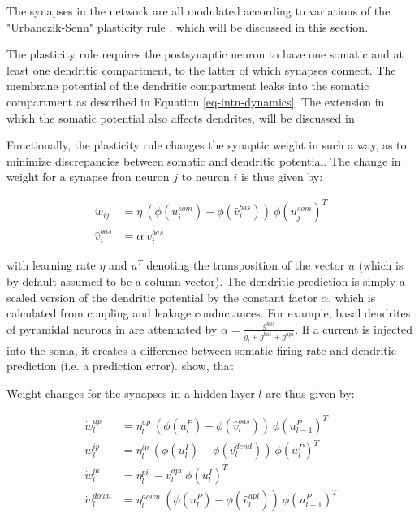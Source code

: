 The synapses in the network are all modulated according to variations of the "Urbanczik-Senn" plasticity rule \citep{urbanczik2014learning},
which will be discussed in this section. 

The plasticity rule requires the postsynaptic neuron to have one somatic and at least one dendritic compartment, to
the latter of which synapses connect. The membrane potential of the dendritic compartment leaks into the somatic 
compartment as described in Equation \ref{eq-intn-dynamics}. The extension 
in which the somatic potential also affects dendrites, will be discussed in 



Functionally, the plasticity rule 
changes the synaptic weight in such a way, as
to minimize discrepancies between somatic and dendritic potential. The change in weight for a synapse fron neuron 
$j$ to neuron $i$ is thus given by:

\begin{align}
  \dot{w}_{ij}    & = \eta \ ( \phi(u_i^{som}) - \phi(\hat{v}_i^{bas}) ) \ \phi(u_j^{som})^T \\
  \hat{v}_i^{bas} & = \alpha \  v_i^{bas}
\end{align}

with learning rate $\eta$ and $u^T$ denoting the transposition of the vector $u$ (which is by default assumed to be
a column vector). The dendritic
prediction is simply a scaled version of the dendritic potential by the constant factor $\alpha$, which is calculated
from coupling and leakage conductances. For example, basal dendrites of pyramidal neurons in \cite{sacramento2018dendritic}
are attenuated by $\alpha = \frac{g^{bas}}{g_l + g^{bas} + g^{api}}$. If a current is injected into the soma, it creates 
a difference between somatic firing rate and dendritic prediction (i.e. a prediction error). \cite{urbanczik2014learning}
show, that 





Weight changes for the synapses in a hidden layer
$l$ are thus given by:

\begin{align}
  \dot{w}_{l}^{up}   & = \eta_l^{up} \ ( \phi(u_l^{P}) - \phi(\hat{v}_l^{bas}) ) \ \phi(u_{l-1}^{P})^T                     \\
  \dot{w}_{l}^{ip}   & = \eta_l^{ip} \ ( \phi(u_l^{I}) - \phi(\hat{v}_l^{dend}) ) \ \phi(u_{l}^{P})^T\label{eq-delta_w_ip} \\
  \dot{w}_{l}^{pi}   & = \eta_l^{pi} \ - v_l^{api} \ \phi(u_l^{I})^T\label{eq-delta_w_pi}                                  \\
  \dot{w}_{l}^{down} & = \eta_l^{down} \ ( \phi(u_l^{P}) - \phi(\hat{v}_l^{api}) )\ \phi(u_{l+1}^{P})^T
\end{align}

